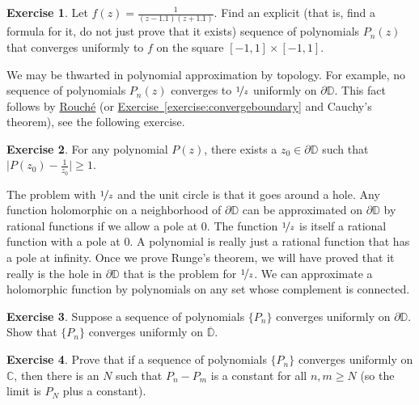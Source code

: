 \documentclass[12pt,openany]{book}
\newcommand{\babs}[1]{\bigl\lvert {#1} \bigr\rvert}
\newcommand{\C}{{\mathbb{C}}}
\newcommand{\D}{{\mathbb{D}}}
\theoremstyle{plain}
\theoremstyle{remark}
\theoremstyle{definition}
\newenvironment{exbox}{%
    \def\FrameCommand{\vrule width 1pt \relax\hspace{10pt}}%
    \MakeFramed{\advance\hsize-\width\FrameRestore}%
}{%
    \endMakeFramed
}
\theoremstyle{exercise}
\newtheorem{exercise}{Exercise}[section]
\theoremstyle{example}
\newcommand{\exerciseref}[1]{\hyperref[#1]{Exercise~\ref*{#1}}}
\begin{document}
\begin{exbox}
\begin{exercise}
Let 
$f(z) = \frac{1}{(z-1.1)(z+1.1)}$.  Find an explicit (that is, find a
formula for it, do not just prove that it exists) sequence of polynomials
$P_n(z)$
that converges uniformly to $f$ on the square $[-1,1] \times [-1,1]$.
\end{exercise}
\end{exbox}

We may be thwarted in polynomial approximation by topology.
For example, no sequence of
polynomials $P_n(z)$ converges to $\nicefrac{1}{z}$ uniformly on $\partial
\D$.  This fact follows by \hyperref[thm:rouche]{Rouch\'e} (or
\exerciseref{exercise:convergeboundary} and Cauchy's theorem), see the
following exercise.

\begin{exbox}
\begin{exercise}
For any polynomial $P(z)$, there exists a $z_0 \in \partial \D$ such that
$\babs{P(z_0)-\frac{1}{z_0}} \geq 1$.
\end{exercise}
\end{exbox}

The problem with $\nicefrac{1}{z}$ and the unit circle is that it goes around a hole.
Any function holomorphic on a neighborhood of $\partial \D$ can be
approximated on $\partial \D$ by rational functions
if we allow a pole at $0$.  The function $\nicefrac{1}{z}$ is
itself a rational function with a pole at $0$.
A polynomial is really just a rational function that has a pole at infinity.
Once we prove Runge's theorem, we will have proved that it really is the hole
in $\partial \D$
that is the problem for $\nicefrac{1}{z}$.
We can approximate a holomorphic function
by polynomials on any set whose complement is connected.

\begin{exbox}
\begin{exercise}
Suppose a sequence of polynomials $\{ P_n \}$ converges uniformly on
$\partial \D$.  Show that $\{ P_n \}$ converges uniformly on
$\overline{\D}$.
\end{exercise}

\begin{exercise}
Prove that if a sequence of polynomials $\{ P_n \}$ converges uniformly on
$\C$,
then there is an $N$ such that $P_n - P_m$ is a constant for all $n,m \geq N$
(so the limit is $P_N$ plus a constant).
\end{exercise}
\end{exbox}
\end{document}
